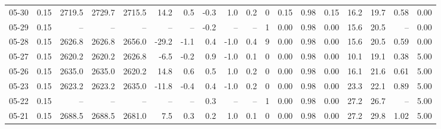 \begin{threeparttable}
{\begin{tabular}{lrrrrrrrrrrrrrrrrr}
  05-30 &     0.15 & 2719.5 & 2729.7 & 2715.5 &       14.2 &            0.5 &                      -0.3 &                      1.0 &                 0.2 &              0 &       0.15 &      0.98 &           0.15 &             16.2 &                19.7 &            0.58 &                   0.00 \\
  05-29 &     0.15 &     -- &     -- &     -- &         -- &             -- &                      -0.2 &                       -- &                  -- &              1 &       0.00 &      0.98 &           0.00 &             15.6 &                20.5 &              -- &                   0.00 \\
  05-28 &     0.15 & 2626.8 & 2626.8 & 2656.0 &      -29.2 &           -1.1 &                       0.4 &                     -1.0 &                 0.4 &              9 &       0.00 &      0.98 &           0.00 &             15.6 &                20.5 &            0.59 &                   0.00 \\
  05-27 &     0.15 & 2620.2 & 2620.2 & 2626.8 &       -6.5 &           -0.2 &                       0.9 &                     -1.0 &                 0.1 &              0 &       0.00 &      0.98 &           0.00 &             10.1 &                19.1 &            0.38 &                   5.00 \\
  05-26 &     0.15 & 2635.0 & 2635.0 & 2620.2 &       14.8 &            0.6 &                       0.5 &                      1.0 &                 0.2 &              0 &       0.00 &      0.98 &           0.00 &             16.1 &                21.6 &            0.61 &                   5.00 \\
  05-23 &     0.15 & 2623.2 & 2623.2 & 2635.0 &      -11.8 &           -0.4 &                       0.4 &                     -1.0 &                 0.2 &              0 &       0.00 &      0.98 &           0.00 &             23.3 &                22.1 &            0.89 &                   5.00 \\
  05-22 &     0.15 &     -- &     -- &     -- &         -- &             -- &                       0.3 &                       -- &                  -- &              1 &       0.00 &      0.98 &           0.00 &             27.2 &                26.7 &              -- &                   5.00 \\
  05-21 &     0.15 & 2688.5 & 2688.5 & 2681.0 &        7.5 &            0.3 &                       0.2 &                      1.0 &                 0.1 &              0 &       0.00 &      0.98 &           0.00 &             27.2 &                29.8 &            1.02 &                   5.00 \\

\end{tabular}}
\end{threeparttable}
